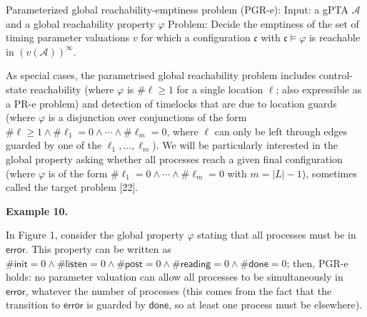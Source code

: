  
 
Parameterized global reachability-emptiness problem (PGR-e): Input: a gPTA $\mathcal{A}$ and a global reachability property $\varphi$ Problem: Decide the emptiness of the set of timing parameter valuations $v$ for which a configuration $\mathfrak{c}$ with $\mathfrak{c}\models\varphi$ is reachable in ${(v(\mathcal{A}))}^{\infty}$.\par
 
 
 
As special cases, the parametrised global reachability problem includes control-state reachability (where $\varphi$ is $\#\mathrm{\ell}\geq 1$ for a single location $\mathrm{\ell}$; also expressible as a PR-e problem) and detection of timelocks that are due to location guards (where $\varphi$ is a disjunction over conjunctions of the form $\#\mathrm{\ell}\geq 1\land\#\mathrm{\ell}_{1}=0\land\cdots\land\#\mathrm{\ell}_{m}=0$, where $\mathrm{\ell}$ can only be left through edges guarded by one of the $\mathrm{\ell}_{1},\ldots,\mathrm{\ell}_{m}$). We will be particularly interested in the global property asking whether all processes reach a given final configuration (where $\varphi$ is of the form $\#\mathrm{\ell}_{1}=0\land\cdots\land\#\mathrm{\ell}_{m}=0$ with $m=|L|-1$), sometimes called the target problem [22].\par
 
 
 
\par\medskip\noindent\textbf{Example 10.}\par
 
 
In Figure 1, consider the global property $\varphi$ stating that all processes must be in $\mathsf{error}$. This property can be written as $\#\mathsf{init}=0\land\#\mathsf{listen}=0\land\#\mathsf{post}=0\land\#\mathsf{reading}=0\land\#\mathsf{done}=0$; then, PGR-e holds: no parameter valuation can allow all processes to be simultaneously in $\mathsf{error}$, whatever the number of processes (this comes from the fact that the transition to $\mathsf{error}$ is guarded by $\mathsf{done}$, so at least one process must be elsewhere).\par
 
